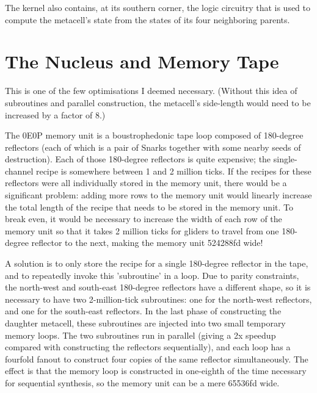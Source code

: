 The kernel also contains, at its southern corner, the logic circuitry that is used to compute the metacell's state from the states of its four neighboring parents.



\section{The Nucleus and Memory Tape}\label{sec:0e0p_structure_nucleus}


This is one of the few optimisations I deemed necessary. (Without this idea of subroutines and parallel construction, the metacell's side-length would need to be increased by a factor of 8.)

The 0E0P memory unit is a boustrophedonic tape loop composed of 180-degree reflectors (each of which is a pair of Snarks together with some nearby seeds of destruction). Each of those 180-degree reflectors is quite expensive; the single-channel recipe is somewhere between 1 and 2 million ticks. If the recipes for these reflectors were all individually stored in the memory unit, there would be a significant problem: adding more rows to the memory unit would linearly increase the total length of the recipe that needs to be stored in the memory unit. To break even, it would be necessary to increase the width of each row of the memory unit so that it takes 2 million ticks for gliders to travel from one 180-degree reflector to the next, making the memory unit 524288fd wide!

A solution is to only store the recipe for a single 180-degree reflector in the tape, and to repeatedly invoke this 'subroutine' in a loop. Due to parity constraints, the north-west and south-east 180-degree reflectors have a different shape, so it is necessary to have two 2-million-tick subroutines: one for the north-west reflectors, and one for the south-east reflectors. In the last phase of constructing the daughter metacell, these subroutines are injected into two small temporary memory loops. The two subroutines run in parallel (giving a 2x speedup compared with constructing the reflectors sequentially), and each loop has a fourfold fanout to construct four copies of the same reflector simultaneously. The effect is that the memory loop is constructed in one-eighth of the time necessary for sequential synthesis, so the memory unit can be a mere 65536fd wide.

